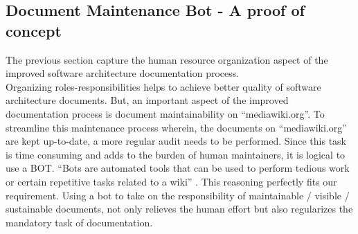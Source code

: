 \subsection{Document Maintenance Bot - A proof of concept}
\indent The previous section capture the human resource organization aspect of the improved software architecture documentation process.
\\\indent Organizing roles-responsibilities helps to achieve better quality of software architecture documents. But, an important aspect of the improved documentation process is document maintainability on \enquote{mediawiki.org}. To streamline this maintenance process wherein, the documents on \enquote{mediawiki.org} are kept up-to-date, a more regular audit needs to be performed. Since this task is time consuming and adds to the burden of human maintainers, it is logical to use a BOT. \enquote{Bots are automated tools that can be used to perform tedious work or certain repetitive tasks related to a wiki} \cite{manual_bot}. This reasoning perfectly fits our requirement. Using a bot to take on the responsibility of maintainable / visible / sustainable documents, not only relieves the human effort but also regularizes the mandatory task of documentation.


